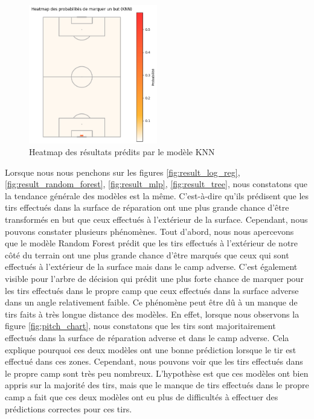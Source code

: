 \documentclass[12pt]{article}
\begin{document}
\begin{figure}[htp]
    \centering
    \includegraphics[width=0.5\textwidth]{img/pitch_visualisation_knn.png}
    \caption{Heatmap des résultats prédits par le modèle KNN}
    \label{fig:result_knn}
\end{figure}
\newpage
Lorsque nous nous penchons sur les figures \ref{fig:result_log_reg}, \ref{fig:result_random_forest}, \ref{fig:result_mlp}, \ref{fig:result_tree}, nous constatons que la tendance générale des modèles est la même.
C'est-à-dire qu'ils prédisent que les tirs effectués dans la surface de réparation ont une plus grande chance d'être transformés en but que ceux effectués à l'extérieur de la surface.
Cependant, nous pouvons constater plusieurs phénomènes.
Tout d'abord, nous nous apercevons que le modèle Random Forest prédit que les tirs effectués à l'extérieur de notre côté du terrain ont une plus grande chance d'être marqués que ceux qui sont effectués à l'extérieur de la surface mais dans le camp adverse.
C'est également visible pour l'arbre de décision qui prédit une plus forte chance de marquer pour les tirs effectués dans le propre camp que ceux effectués dans la surface adverse dans un angle relativement faible.
Ce phénomène peut être dû à un manque de tirs faits à très longue distance des modèles.
En effet, lorsque nous observons la figure \ref{fig:pitch_chart}, nous constatons que les tirs sont majoritairement effectués dans la surface de réparation adverse et dans le camp adverse.
Cela explique pourquoi ces deux modèles ont une bonne prédiction lorsque le tir est effectué dans ces zones.
Cependant, nous pouvons voir que les tirs effectués dans le propre camp sont très peu nombreux.
L'hypothèse est que ces modèles ont bien appris sur la majorité des tirs, mais que le manque de tirs effectués dans le propre camp a fait que ces deux modèles ont eu plus de difficultés à effectuer des prédictions correctes pour ces tirs.
\end{document}
